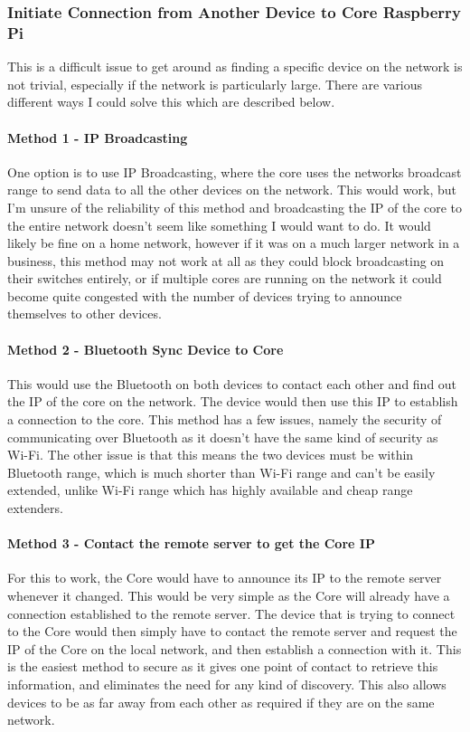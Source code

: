\subsubsection*{Initiate Connection from Another Device to Core Raspberry Pi}
This is a difficult issue to get around as finding a specific device on the network is not trivial, especially if the network is particularly large. There are various different ways I could solve this which are described below.

\paragraph*{Method 1 - IP Broadcasting} One option is to use IP Broadcasting, where the core uses the networks broadcast range to send data to all the other devices on the network. This would work, but I'm unsure of the reliability of this method and broadcasting the IP of the core to the entire network doesn't seem like something I would want to do. It would likely be fine on a home network, however if it was on a much larger network in a business, this method may not work at all as they could block broadcasting on their switches entirely, or if multiple cores are running on the network it could become quite congested with the number of devices trying to announce themselves to other devices.

\paragraph*{Method 2 - Bluetooth Sync Device to Core} This would use the Bluetooth on both devices to contact each other and find out the IP of the core on the network. The device would then use this IP to establish a connection to the core. This method has a few issues, namely the security of communicating over Bluetooth as it doesn't have the same kind of security as Wi-Fi. The other issue is that this means the two devices must be within Bluetooth range, which is much shorter than Wi-Fi range and can't be easily extended, unlike Wi-Fi range which has highly available and cheap range extenders.

\paragraph*{Method 3 - Contact the remote server to get the Core IP} For this to work, the Core would have to announce its IP to the remote server whenever it changed. This would be very simple as the Core will already have a connection established to the remote server. The device that is trying to connect to the Core would then simply have to contact the remote server and request the IP of the Core on the local network, and then establish a connection with it. This is the easiest method to secure as it gives one point of contact to retrieve this information, and eliminates the need for any kind of discovery. This also allows devices to be as far away from each other as required if they are on the same network.

